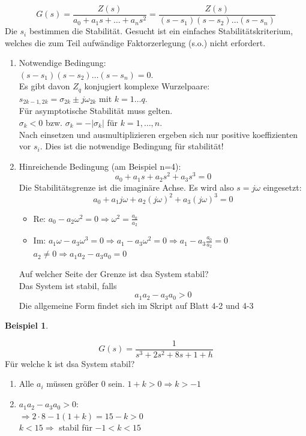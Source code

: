 \message{ !name(Mitschrieb_SysRegel.tex)}\documentclass[12pt,a4paper,ngerman]{scrartcl}
\newtheorem{bsp}{Beispiel}[section] %
\begin{document}
\[
G(s)=\frac{Z(s)}{a_0+a_1s+\dots+a_ns^2}=\frac{Z(s)}{(s-s_1)(s-s_2)\dots (s-s_n)}
\]
Die $s_i$ bestimmen die Stabilität. Gesucht ist ein einfaches Stabilitätskriterium, welches die zum Teil aufwändige Faktorzerlegung (s.o.) nicht erfordert.
\begin{enumerate}
\item Notwendige Bedingung:\\
$(s-s_1)(s-s_2)\dots (s-s_n)=0$.\\
Es gibt davon $Z_q$ konjugiert komplexe Wurzelpaare:\\
$s_{2k-1,2k}=\sigma_{2k}\pm j\omega_{2k}$ mit $k=1\dots q$.\\
Für asymptotische Stabilität muss gelten. \\
$\sigma_k<0$ bzw. $\sigma_k=-|\sigma_k|$ für $k=1,\dots, n$. \\
Nach einsetzen und ausmultiplizieren ergeben sich nur positive koeffizienten vor $s_i$. Dies ist die notwendige Bedingung für stabilität!
\item Hinreichende Bedingung (am Beispiel n=4):
\[
a_0+a_1s+a_2s^2+a_3s^3=0
\]
Die Stabilitätsgrenze ist die imaginäre Achse. Es wird also $s=j\omega$ eingesetzt:
\[
a_0+a_1j\omega+a_2(j\omega)^2+a_3(j\omega)^3=0
\]


\begin{itemize}
\item Re: $a_0-a_2\omega^2=0\Rightarrow \omega^2=\frac{a_0}{a_2}$
\item Im: $a_1\omega -a_3\omega^3=0\Rightarrow a_1-a_3\omega^2=0\Rightarrow a_1-a_3\frac{a_0}{a_2}=0$\\
$a_2\neq0 \Rightarrow a_1a_2-a_3a_0=0$ 
\end{itemize}
Auf welcher Seite der Grenze ist dsa System stabil?\\
Das System ist stabil, falls \[a_1a_2-a_3a_0>0\]
Die allgemeine Form findet sich im Skript auf Blatt 4-2 und 4-3
\end{enumerate}
\begin{bsp}
\end{bsp}
\[
G(s)=\frac{1}{s^3+2s^2+8s+1+h}
\]
Für welche k ist dsa System stabil?\\
\begin{enumerate}
\item Alle $a_i$ müssen größer 0 sein. $1+k>0 \Rightarrow k>-1$
\item $a_1a_2-a_3a_0>0$:\\
$\Rightarrow 2\cdot 8-1(1+k)=15-k>0$\\
$k<15 \Rightarrow$ stabil für $-1<k<15$
\end{enumerate}
\end{document}
